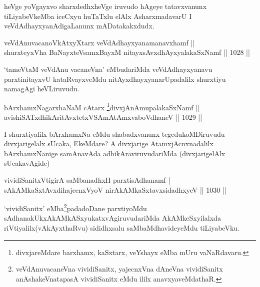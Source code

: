 \begin{artha}
heVge yoVgayxvo sharxdedhxheVge iruvudo hAgeye tatavxvanunx tiLiyabeVkeMba iceCxyu huTaTxlu elAlx AsharxmadavarU I veVdAdhayxyanAdigaLanunx mADatakakxdudx.
\end{artha}


\begin{shl}
veVdAnuvacanoVkAtxyX\s tarx veVdAdhayxyanamanavxhamf || \\
shurxteyxVha BaNayxteV\s samxBayxM nitayxsAvxdhAyxyalakaSxNamf \hfill || 1028 ||  
\end{shl}

\begin{artha}
`tameVtaM veVdAnu vacaneVna' eMbudariMda veVdAdhayxyanavu parxtinitayxvU kataRvayxveMdu nitAyxdhayxyanarUpadalilx shurxtiyu namagAgi heVLiruvudu.
\end{artha}


\begin{shl}
bArxhamxNagarxhaNaM cAtarx \footnote{divxjareMdare barxhamx, kaSxtarx, veYshayx eMba mUru vaNaRdavaru.}divxjAnAmupalakaSxNamf || \\
avishiSATxdhikAritAvxtetxVSAmAtAmxvaboVdhaneV \hfill || 1029 ||  
\end{shl}

\begin{artha}
I shurxtiyalilx bArxhamxNa eMdu shabadxvanunx tegedukoMDiruvudu divxjarigelalx sUcaka, EkeMdare? A divxjarige AtamxjAcnxnadalilx bArxhamxNanige samAnavAda adhikAraviruvudariMda (divxjarigelAlx sUcakavAgide)
\end{artha}


\begin{shl}
vividiSanitxVtigirA saMbanadhxH parxtisAdhanamf |\\
sAkAMkaSxtAvxdihajecnxVyoV nirAkAMkaSxtavxsidadhxyeV \hfill || 1030 ||
\end{shl}

\begin{artha}
`vividiSanitx' eMba\footnote{veVdAnuvacaneVna vividiSanitx, yajecnxVna dAneVna vividiSanitx anAshakeVnatapasA vividiSanitx eMdu ililx anavxyaveMdathaR.}padadoDane parxtiyoMdu sAdhanakUkx\break AkAMkASxyukatxvAgiruvudariMda AkAMkeSxyilalxda riVtiyalilx\break (vAkAyxthaRvu) sididhxsalu saMbaMdhavideyeMdu tiLiyabeVku.
\end{artha}

